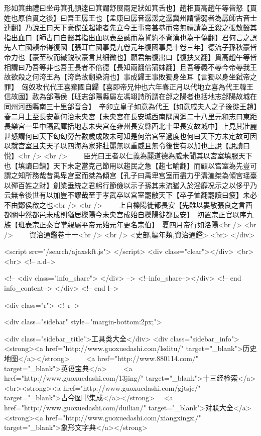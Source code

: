 形如箕曲禮曰坐毋箕孔頴逹曰箕謂舒展兩足狀如箕舌也】趙相貫高趙午等皆怒【貫姓也原伯貫之後】曰吾王孱王也【孟康曰孱音潺湲之潺冀州謂懦弱者為孱師古音士連翻】乃說王曰天下豪傑並起能者先立今王事帝甚恭而帝無禮請為王殺之張敖齧其指出血曰【師古曰自齧其指出血以表至誠而為誓約不背漢也為于偽翻】君何言之誤先人亡國賴帝得復國【張耳亡國事見九卷元年復國事見十卷三年】德流子孫秋豪皆帝力也【豪至秋而纎鋭秋豪言其細微也】願君無復出口【復扶又翻】貫高趙午等皆相謂曰乃吾等非也吾王長者不倍德【長知兩翻倍蒲妹翻】且吾等義不辱今帝辱我王故欲殺之何洿王為【洿烏故翻染涴也】事成歸王事敗獨身坐耳【言獨以身坐弑帝之罪】　匈奴攻代代王喜棄國自歸【喜即帝兄仲也六年春正月以代地立喜為代王韓王信故國】赦為郃陽侯【班志郃陽縣屬左馮翊詩所謂在郃之陽者也括地志郃陽故城在同州河西縣南三十里郃音合】　辛卯立皇子如意為代王【如意戚夫人之子後徙王趙】　春二月上至長安蕭何治未央宮【未央宮在長安城西南隅周迴二十八里元和志曰東距長樂宮一里中隔武庫括地志未央宫在雍州長安縣西北十里長安故城中】上見其壯麗甚怒謂何曰天下匈匈勞苦數歲成敗未可知是何治宮室過度也何曰天下方未定故可因以就宫室且夫天子以四海為家非壯麗無以重威且無令後世有以加也上說【說讀曰悦】<br />
<br />
　　臣光曰王者以仁義為麗道德為威未聞其以宮室填服天下也【填讀曰鎮】天下未定當克己節用以趨民之急【趨七喻翻】而顧以宫室為先豈可謂之知所務哉昔禹卑宫室而桀為傾宫【孔子曰禹卑宫室而盡力乎溝洫桀為傾宮瑶臺以殫百姓之財】創業垂統之君躬行節儉以示子孫其末流猶入於淫靡况示之以侈乎乃云無令後世有以加豈不謬哉至于孝武卒以宮室罷敝天下【卒子恤翻罷讀曰疲】未必不由酇侯啟之也<br />
<br />
　　上自櫟陽徙都長安【先雖以婁敬張良之言西都關中然都邑未成則猶居櫟陽今未央宫成始自櫟陽徙都長安】　初置宗正官以序九族【班表宗正秦官掌親屬平帝元始元年更名宗伯】　夏四月帝行如洛陽<br />
<br />
　　資治通鑑卷十一<br />
<br />
<史部,編年類,資治通鑑>  <br>
   </div> 

<script src="/search/ajaxskft.js"> </script>
 <div class="clear"></div>
<br>
<br>
 <!-- a.d-->

 <!--
<div class="info_share">
</div> 
-->
 <!--info_share--></div>   <!-- end info_content-->
  </div> <!-- end l-->

<div class="r">   <!--r-->



<div class="sidebar"  style="margin-bottom:2px;">

 
<div class="sidebar_title">工具类大全</div>
<div class="sidebar_info">
<strong><a href="http://www.guoxuedashi.com/lsditu/" target="_blank">历史地图</a></strong>　　
<a href="http://www.880114.com/" target="_blank">英语宝典</a>　　
<a href="http://www.guoxuedashi.com/13jing/" target="_blank">十三经检索</a>　
<br><strong><a href="http://www.guoxuedashi.com/gjtsjc/" target="_blank">古今图书集成</a></strong>　
<a href="http://www.guoxuedashi.com/duilian/" target="_blank">对联大全</a>　<strong><a href="http://www.guoxuedashi.com/xiangxingzi/" target="_blank">象形文字典</a></strong>　

